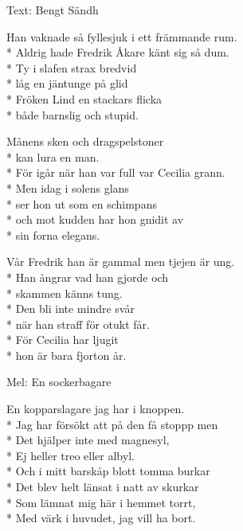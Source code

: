 \pagestyle{Dagen efter}
\begin{SongText}
\begin{SongInfo}
    Text: Bengt Sändh
\end{SongInfo}
\begin{SongVerse}
Han vaknade så fyllesjuk i ett främmande rum.\\*%
Aldrig hade Fredrik Åkare känt sig så dum.\\*%
Ty i slafen strax bredvid\\*%
låg en jäntunge på glid\\*%
Fröken Lind en stackars flicka\\*%
både barnslig och stupid.
\end{SongVerse}
\begin{SongVerse}
Månens sken och dragspelstoner\\*%
kan lura en man.\\*%
För igår när han var full var Cecilia grann.\\*%
Men idag i solens glans\\*%
ser hon ut som en schimpans\\*%
och mot kudden har hon gnidit av\\*%
sin forna elegans.
\end{SongVerse}
\begin{SongVerse}
Vår Fredrik han är gammal men tjejen är ung.\\*%
Han ångrar vad han gjorde och\\*%
skammen känns tung.\\*%
Den bli inte mindre svår\\*%
när han straff för otukt får.\\*%
För Cecilia har ljugit\\*%
hon är bara fjorton år.
\end{SongVerse}
\end{SongText}
\begin{SongText}[Kopparslagaren]
\begin{SongInfo}
    Mel: En sockerbagare
\end{SongInfo}
\begin{SongVerse}
En kopparslagare jag har i knoppen.\\*%
Jag har försökt att på den få stoppp men\\*%
Det hjälper inte med magnesyl,\\*%
Ej heller treo eller albyl.\\*%
Och i mitt barskåp blott tomma burkar\\*%
Det blev helt länsat i natt av skurkar\\*%
Som lämnat mig här i hemmet torrt,\\*%
Med värk i huvudet, jag vill ha bort. 
\end{SongVerse}
\end{SongText}
